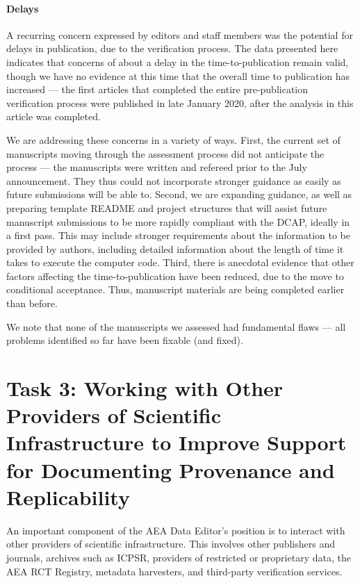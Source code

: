 \documentclass[PP]{AEA}
\begin{document}
\paragraph{Delays} A recurring concern expressed by editors and staff members was the potential for   delays in publication, due to the verification process. The data presented here indicates that concerns of about a delay in the time-to-publication remain valid, though we have no evidence at this time that the overall time to publication has increased --- the first articles that completed the entire pre-publication verification process were published in late January 2020, after the analysis in this article was completed.

We are addressing these concerns in a variety of ways. First, the current set of manuscripts moving through the assessment process did not anticipate the process --- the manuscripts were written and refereed prior to the July announcement. They thus could not incorporate stronger guidance as easily as future submissions will be able to. Second, we are expanding guidance, as well as preparing template README and project structures that will assist future manuscript submissions to be more rapidly compliant with the \ac{DCAP}, ideally in a first pass. This may include stronger requirements about the information to be provided by authors, including detailed information about the length of time it takes to execute the computer code.
Third, there is anecdotal evidence that other factors affecting the time-to-publication have been reduced, due to the move to conditional acceptance. Thus, manuscript materials are being completed earlier than before. 

We note that none of the \jiramcs{} manuscripts we assessed had  fundamental flaws --- all problems identified so far have been fixable (and fixed). 





\section{Task 3: Working with Other Providers of Scientific Infrastructure to Improve Support for Documenting Provenance and Replicability}
\label{sec:coordination}

An important component of the AEA Data Editor's position is to interact with other providers of scientific infrastructure. This involves other publishers and journals, archives such as ICPSR, providers of restricted or proprietary data, the AEA RCT Registry, metadata harvesters, and third-party verification services. 
\end{document}
